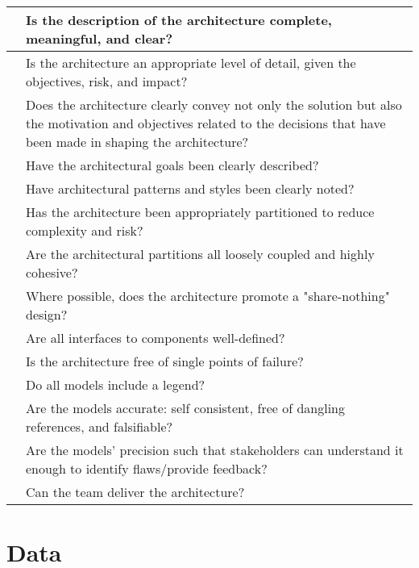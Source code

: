 \documentclass{article}
\begin{document}
\begin{center}
\begin{tabular}{ | p{.25cm} || p{10cm} |}
     & Is the description of the architecture complete, meaningful, and clear? \\ \hline
     & Is the architecture an  appropriate level of detail, given the objectives, risk, and impact? \\ \hline
     & Does the architecture clearly convey not only the solution but also the motivation and objectives related to the decisions that have been made in shaping the architecture? \\ \hline
     & Have the architectural goals been clearly described? \\ \hline
     & Have architectural patterns and styles been clearly noted? \\ \hline
     & Has the architecture been appropriately partitioned to reduce complexity and risk? \\ \hline
     & Are the architectural partitions all loosely coupled and highly cohesive? \\ \hline
     & Where possible, does the architecture promote a "share-nothing" design? \\ \hline
     & Are all interfaces to components well-defined? \\ \hline
     & Is the architecture free of single points of failure? \\ \hline
     & Do all models include a legend? \\ \hline
     & Are the models accurate: self consistent, free of dangling references, and falsifiable? \\ \hline
     & Are the models' precision such that stakeholders can understand it enough to identify flaws/provide feedback? \\ \hline
     & Can the team deliver the architecture? \\ \hline
    \end{tabular}
\end{center}



\section{Data}
\end{document}
